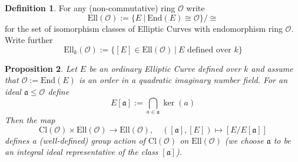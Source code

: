 \documentclass{scrartcl}
\newcommand{\End}{\mathrm{End}}
\newcommand{\Ell}{\mathrm{Ell}}
\newcommand{\Cl}{\mathrm{Cl}}
\newcommand{\Order}{\mathcal{O}}
\newtheorem{prop}{Proposition}[section]
\theoremstyle{definition}
\newtheorem{definition}[prop]{Definition}
\begin{document}
\begin{definition}
    For any (non-commutative) ring $\Order$ write
    \begin{equation*}
        \Ell(\Order) := \{ E \ | \ \End(E) \cong \Order \} / \cong
    \end{equation*}
    for the set of isomorphism classes of Elliptic Curves with endomorphism ring $\Order$.
    Write further
    \begin{equation*}
        \Ell_k(\Order) := \{ [E] \in \Ell(\Order) \ | \ \text{$E$ defined over $k$} \}
    \end{equation*}
\end{definition}
\begin{prop}
    Let $E$ be an ordinary Elliptic Curve defined over $k$ and assume that $\Order := \End(E)$ is an order in a quadratic imaginary number field.
    For an ideal $\mathfrak{a} \leq \Order$ define
    \begin{equation*}
        E[\mathfrak{a}] := \bigcap_{a \in \mathfrak{a}} \ker(a)
    \end{equation*}
    Then the map
    \begin{equation*}
        \Cl(\Order) \times \Ell(\Order) \to \Ell(\Order), \quad ([\mathfrak{a}], [E]) \mapsto [E/E[\mathfrak{a}]]
    \end{equation*}
    defines a (well-defined) group action of $\Cl(\Order)$ on $\Ell(\Order)$ (we choose $\mathfrak{a}$ to be an integral ideal representative of the class $[\mathfrak{a}]$). 
\end{prop}
\end{document}
